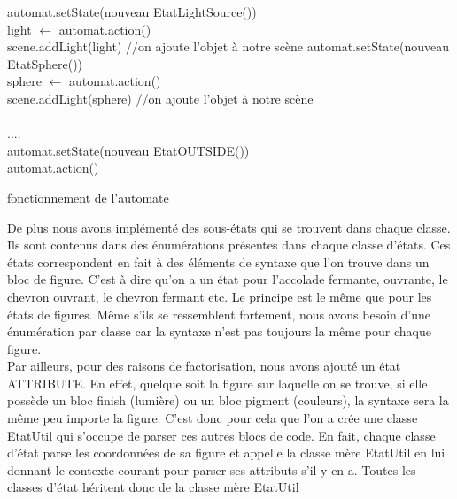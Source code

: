 \documentclass[../../Rapport RayTracer]{subfiles}
\begin{document}
\begin{algorithm}[H]
\DontPrintSemicolon
{}
{
	{
		{
			{
				automat.setState(nouveau EtatLightSource())\hfill\\
				light $\gets$ automat.action()\hfill\\
				scene.addLight(light) //on ajoute l'objet à notre scène
			}
			{
				automat.setState(nouveau EtatSphere())\hfill\\
				sphere $\gets$ automat.action()\hfill\\
				scene.addLight(sphere) //on ajoute l'objet à notre scène\hfill\\
			}
			\hfill\\
			....
			\hfill\\
			{
				automat.setState(nouveau EtatOUTSIDE())\hfill\\
				automat.action()\hfill\\
			}
		}
	}
}
\caption{fonctionnement de l'automate}
\label{exempleAutomat}
\end{algorithm}


De plus nous avons implémenté des sous-états qui se trouvent dans chaque classe. Ils sont contenus dans des énumérations présentes dans chaque classe d'états. Ces états correspondent en fait à des éléments de syntaxe que l'on trouve dans un bloc de figure. C'est à dire qu'on a un état pour l'accolade fermante, ouvrante, le chevron ouvrant, le chevron fermant etc.
Le principe est le même que pour les états de figures. Même s'ils se ressemblent fortement, nous avons besoin d'une énumération par classe car la syntaxe n'est pas toujours la même pour chaque figure.
\\

Par ailleurs, pour des raisons de factorisation, nous avons ajouté un état ATTRIBUTE. En effet, quelque soit la figure sur laquelle on se trouve, si elle possède un bloc finish (lumière) ou un bloc pigment (couleurs), la syntaxe sera la même peu importe la figure. C'est donc pour cela que l'on a crée une classe EtatUtil qui s'occupe de parser ces autres blocs de code. En fait, chaque classe d'état parse les coordonnées de sa figure et appelle la classe mère EtatUtil en lui donnant le contexte courant pour parser ses attributs s'il y en a. Toutes les classes d'état héritent donc de la classe mère EtatUtil
\end{document}
